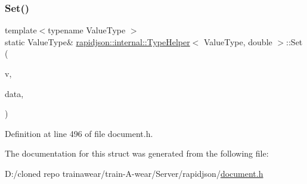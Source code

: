 \subsubsection{\texorpdfstring{Set()}{Set()}\hspace{0.1cm}{\footnotesize\ttfamily [2/2]}}
{\footnotesize\ttfamily template$<$typename Value\+Type $>$ \\
static Value\+Type\& \mbox{\hyperlink{structrapidjson_1_1internal_1_1_type_helper}{rapidjson\+::internal\+::\+Type\+Helper}}$<$ Value\+Type, double $>$\+::Set (\begin{DoxyParamCaption}\item[{Value\+Type \&}]{v,  }\item[{double}]{data,  }\item[{typename Value\+Type\+::\+Allocator\+Type \&}]{ }\end{DoxyParamCaption})\hspace{0.3cm}{\ttfamily [static]}}



Definition at line 496 of file document.\+h.


\begin{DoxyCode}{0}

\end{DoxyCode}


The documentation for this struct was generated from the following file\+:\begin{DoxyCompactItemize}
\item 
D\+:/cloned repo trainawear/train-\/\+A-\/wear/\+Server/rapidjson/\mbox{\hyperlink{document_8h}{document.\+h}}\end{DoxyCompactItemize}
